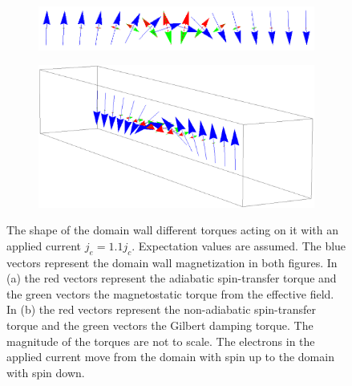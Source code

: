 \documentclass[12pt, a4paper, twoside, openright]{article}		%
\numberwithin{equation}{section}
\begin{document}
\begin{figure}[h!]
\centering
\begin{subfigure}{\textwidth}
  \centering
  \includegraphics[width=1.0\linewidth]{Figures/NeelJeGTJcAdSTTMS.png}
  \caption{}
  \label{fig:Neel_AdSTT_Heff_JeGTJc}
\end{subfigure}
\begin{subfigure}{\textwidth}
  \centering
  \includegraphics[width=1.0\linewidth]{Figures/NeelJeGTJcNonAdSTTGD.png}
  \caption{}
  \label{fig:Neel_NonAdSTT_GD_JeGTJc}
\end{subfigure}
\caption{The shape of the domain wall different torques acting on it with an applied current $j_e=1.1j_c$. Expectation values are assumed. The blue vectors represent the domain wall magnetization in both figures. In (a) the red vectors represent the adiabatic spin-transfer torque and the green vectors the magnetostatic torque from the effective field. In (b) the red vectors represent the non-adiabatic spin-transfer torque and the green vectors the Gilbert damping torque. The magnitude of the torques are not to scale. The electrons in the applied current move from the domain with spin up to the domain with spin down.}
\label{fig:DW_JeGTJc}
\end{figure}
\end{document}
